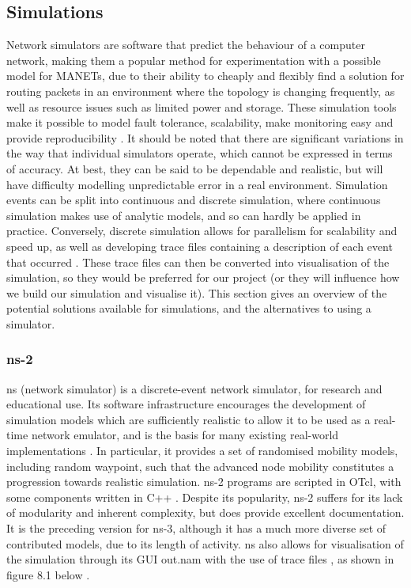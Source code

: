 \subsection{Simulations}
\label{simSoft}
Network simulators are software that predict the behaviour of a computer network, making them a popular method for experimentation with a possible model for MANETs, due to their ability to cheaply and flexibly find a solution for routing packets in an environment where the topology is changing frequently, as well as resource issues such as limited power and storage. These simulation tools make it possible to model fault tolerance, scalability, make monitoring easy and provide reproducibility \cite{stuartkurkowski2005}. It should be noted that there are significant variations in the way that individual simulators operate, which cannot be expressed in terms of accuracy. At best, they can be said to be dependable and realistic, but will have difficulty modelling unpredictable error in a real environment. Simulation events can be split into continuous and discrete simulation, where continuous simulation makes use of analytic models, and so can hardly be applied in practice. Conversely, discrete simulation allows for parallelism for scalability and speed up, as well as developing trace files containing a description of each event that occurred \cite{luchogie2006}. These trace files can then be converted into visualisation of the simulation, so they would be preferred for our project (or they will influence how we build our simulation and visualise it). This section gives an overview of the potential solutions available for simulations, and the alternatives to using a simulator.

\subsubsection{ns-2}
ns (network simulator) is a discrete-event network simulator, for research and educational use. Its software infrastructure encourages the development of simulation models which are sufficiently realistic to allow it to be used as a real-time network emulator, and is the basis for many existing real-world implementations \cite{tommasopecorella2016}. In particular, it provides a set of randomised mobility models, including random waypoint, such that the advanced node mobility constitutes a progression towards realistic simulation. ns-2 programs are scripted in OTcl, with some components written in C++ . Despite its popularity, ns-2 suffers for its lack of modularity and inherent complexity, but does provide excellent documentation. It is the preceding version for ns-3, although it has a much more diverse set of contributed models, due to its length of activity. ns also allows for visualisation of the simulation through its GUI out.nam with the use of trace files , as shown in figure 8.1 below \cite{luchogie2006}.

